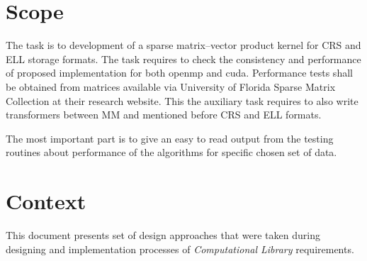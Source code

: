 \section{Scope} \label{s:introduction:scope}
	\begin{comment}
		This standard describes software designs and establishes the information content and organization of a
		software design description (SDD). An SDD is a representation of a software design to be used for
		recording design information and communicating that design information to key design stakeholders. This
		standard is intended for use in design situations in which an explicit SDD is to be prepared. These
		situations include traditional software construction activities, when design leads to code, and “reverse
		engineering” situations when a design description is recovered from an existing implementation.
		This standard can be applied to commercial, scientific, or military software that runs on digital computers.
		Applicability is not restricted by the size, complexity, or criticality of the software. This standard can be
		applied to the description of high-level and detailed designs.
		This standard does not prescribe specific methodologies for design, configuration management, or quality
		assurance. This standard does not require the use of any particular design languages, but establishes
		requirements on the selection of design languages for use in an SDD. This standard can be applied to the
		preparation of SDDs captured as paper documents, automated databases, software development tools, or
		other media.
	\end{comment}
	The task is to development of a sparse matrix--vector product kernel for \gls{CRS} and \gls{ELL} storage formats. The task requires to check the consistency and performance of proposed implementation for both \gls{openmp} and \gls{cuda}. Performance tests shall be obtained from matrices available via University of Florida Sparse Matrix Collection at their research website. This the auxiliary task requires to also write transformers between \gls{MM} and mentioned before \gls{CRS} and \gls{ELL} formats.
	
	The most important part is to give an easy to read output from the testing routines about performance of the algorithms for specific chosen set of data.
\section{Context} \label{s:introduction:context}
	\begin{comment}
		Context of the document.
	\end{comment}
	This document presents set of design approaches that were taken during designing and implementation processes of \emph{Computational Library} requirements.
	
